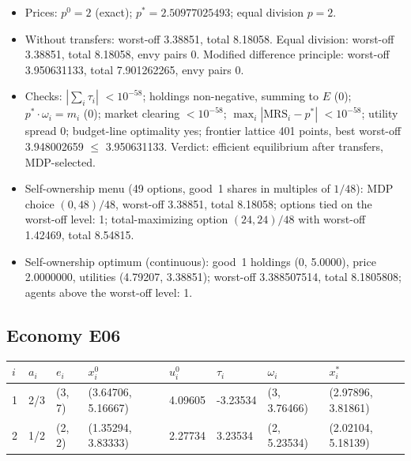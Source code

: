\begin{itemize}[leftmargin=1.2em,itemsep=0pt,topsep=2pt]\footnotesize
\item Prices: $p^0 = 2$ (exact); $p^* = 2.50977025493$; equal division $p = 2$.
\item Without transfers: worst-off 3.38851, total 8.18058. Equal division: worst-off 3.38851, total 8.18058, envy pairs 0. Modified difference principle: worst-off 3.950631133, total 7.901262265, envy pairs 0.
\item Checks: $|\sum_i\tau_i|$ $<10^{-58}$; holdings non-negative, summing to $E$ (0); $p^*\cdot\omega_i = m_i$ (0); market clearing $<10^{-58}$; $\max_i|\mathrm{MRS}_i - p^*|$ $<10^{-58}$; utility spread 0; budget-line optimality yes; frontier lattice 401 points, best worst-off 3.948002659 $\leq$ 3.950631133. Verdict: efficient equilibrium after transfers, MDP-selected.
\item Self-ownership menu (49 options, good~1 shares in multiples of $1/48$): MDP choice $(0, 48)/48$, worst-off 3.38851, total 8.18058; options tied on the worst-off level: 1; total-maximizing option $(24, 24)/48$ with worst-off 1.42469, total 8.54815.
\item Self-ownership optimum (continuous): good~1 holdings (0, 5.0000), price 2.0000000, utilities (4.79207, 3.38851); worst-off 3.388507514, total 8.1805808; agents above the worst-off level: 1.
\end{itemize}

\subsection*{Economy E06}
\label{ec:E06}
{\scriptsize\setlength{\tabcolsep}{3pt}
\begin{tabular}{@{}llllllll@{}}
\toprule
$i$ & $a_i$ & $e_i$ & $x^0_i$ & $u^0_i$ & $\tau_i$ & $\omega_i$ & $x^*_i$ \\
\midrule
1 & 2/3 & (3, 7) & (3.64706, 5.16667) & 4.09605 & -3.23534 & (3, 3.76466) & (2.97896, 3.81861) \\
2 & 1/2 & (2, 2) & (1.35294, 3.83333) & 2.27734 & 3.23534 & (2, 5.23534) & (2.02104, 5.18139) \\
\bottomrule\end{tabular}}

